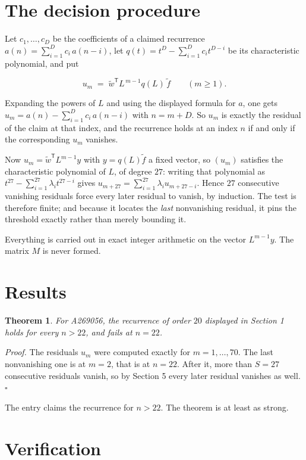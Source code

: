 \documentclass[11pt]{article}
\newtheorem{theorem}{Theorem}
\theoremstyle{definition}
\begin{document}
\section{The decision procedure}

Let $c_1,\dots,c_D$ be the coefficients of a claimed recurrence $a(n) = \sum_{i=1}^{D} c_i\,a(n-i)$, let $q(t) = t^{D} - \sum_{i=1}^{D} c_i t^{D-i}$ be its characteristic polynomial, and put

\[u_m \;=\; \tilde w^{\mathsf T} L^{\,m-1} q(L)\,\tilde f \qquad (m \ge 1).\]

Expanding the powers of $L$ and using the displayed formula for $a$, one gets $u_m = a(n) - \sum_{i=1}^{D} c_i\,a(n-i)$ with $n = m + D$. So $u_m$ is exactly the residual of the claim at that index, and the recurrence holds at an index $n$ if and only if the corresponding $u_m$ vanishes.

Now $u_m = \tilde w^{\mathsf T} L^{m-1} y$ with $y = q(L)\tilde f$ a fixed vector, so $(u_m)$ satisfies the characteristic polynomial of $L$, of degree $27$: writing that polynomial as $t^{27} - \sum_{i=1}^{27} \lambda_i t^{27-i}$ gives $u_{m+27} = \sum_{i=1}^{27} \lambda_i u_{m+27-i}$. Hence $27$ consecutive vanishing residuals force every later residual to vanish, by induction. The test is therefore finite; and because it locates the {\itshape last} nonvanishing residual, it pins the threshold exactly rather than merely bounding it.

Everything is carried out in exact integer arithmetic on the vector $L^{m-1}y$. The matrix $M$ is never formed.

\section{Results}

\begin{theorem} For A269056, the recurrence of order $20$ displayed in Section 1 holds for every $n > 22$, and fails at $n = 22$.\end{theorem}

{\itshape Proof.} The residuals $u_m$ were computed exactly for $m = 1,\dots,70$. The last nonvanishing one is at $m = 2$, that is at $n = 22$. After it, more than $S = 27$ consecutive residuals vanish, so by Section 5 every later residual vanishes as well. $\square$

The entry claims the recurrence for $n > 22$. The theorem is at least as strong.

\section{Verification}
\end{document}

